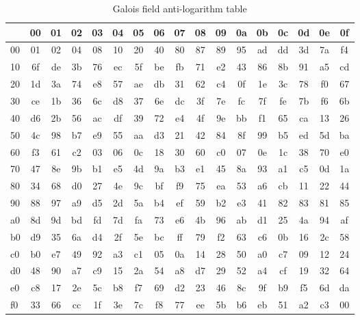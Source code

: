 \bigskip

\begin{table}
\begin{center}
\begin{tabular}{|l||c|c|c|c|c|c|c|c|c|c|c|c|c|c|c|c|}
\hline
&  00 & 01 & 02 & 03 & 04 & 05 & 06 & 07 & 08 & 09 & 0a & 0b & 0c & 0d & 0e & 0f \\
\hline
\hline
00 &  01 & 02 & 04 & 08 & 10 & 20 & 40 & 80 & 87 & 89 & 95 & ad & dd & 3d & 7a & f4 \\
\hline
10 &  6f & de & 3b & 76 & ec & 5f & be & fb & 71 & e2 & 43 & 86 & 8b & 91 & a5 & cd \\
\hline
20 &  1d & 3a & 74 & e8 & 57 & ae & db & 31 & 62 & c4 & 0f & 1e & 3c & 78 & f0 & 67 \\
\hline
30 &  ce & 1b & 36 & 6c & d8 & 37 & 6e & dc & 3f & 7e & fc & 7f & fe & 7b & f6 & 6b \\
\hline
40 &  d6 & 2b & 56 & ac & df & 39 & 72 & e4 & 4f & 9e & bb & f1 & 65 & ca & 13 & 26 \\
\hline
50 &  4c & 98 & b7 & e9 & 55 & aa & d3 & 21 & 42 & 84 & 8f & 99 & b5 & ed & 5d & ba \\
\hline
60 &  f3 & 61 & c2 & 03 & 06 & 0c & 18 & 30 & 60 & c0 & 07 & 0e & 1c & 38 & 70 & e0 \\
\hline
70 &  47 & 8e & 9b & b1 & e5 & 4d & 9a & b3 & e1 & 45 & 8a & 93 & a1 & c5 & 0d & 1a \\
\hline
80 &  34 & 68 & d0 & 27 & 4e & 9c & bf & f9 & 75 & ea & 53 & a6 & cb & 11 & 22 & 44 \\
\hline
90 &  88 & 97 & a9 & d5 & 2d & 5a & b4 & ef & 59 & b2 & e3 & 41 & 82 & 83 & 81 & 85 \\
\hline
a0 &  8d & 9d & bd & fd & 7d & fa & 73 & e6 & 4b & 96 & ab & d1 & 25 & 4a & 94 & af \\
\hline
b0 &  d9 & 35 & 6a & d4 & 2f & 5e & bc & ff & 79 & f2 & 63 & c6 & 0b & 16 & 2c & 58 \\
\hline
c0 &  b0 & e7 & 49 & 92 & a3 & c1 & 05 & 0a & 14 & 28 & 50 & a0 & c7 & 09 & 12 & 24 \\
\hline
d0 &  48 & 90 & a7 & c9 & 15 & 2a & 54 & a8 & d7 & 29 & 52 & a4 & cf & 19 & 32 & 64 \\
\hline
e0 &  c8 & 17 & 2e & 5c & b8 & f7 & 69 & d2 & 23 & 46 & 8c & 9f & b9 & f5 & 6d & da \\
\hline
f0 &  33 & 66 & cc & 1f & 3e & 7c & f8 & 77 & ee & 5b & b6 & eb & 51 & a2 & c3 & 00 \\
\hline
\end{tabular}
\end{center}
\caption{Galois field anti-logarithm table}
\label{anti-log-table}
\label{LastPage}
\end{table}
